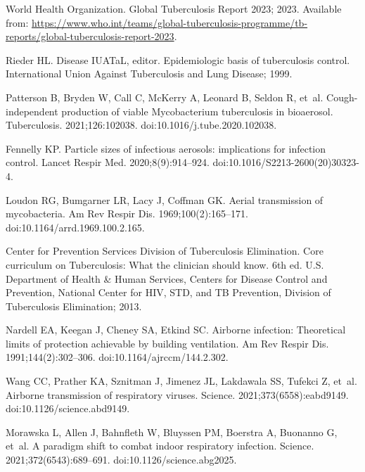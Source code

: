 \documentclass[fleqn,11pt]{wlscirep}
\begin{document}
\begin{thebibliography}{10}

{World Health Organization}.
\newblock Global {Tuberculosis} {Report} 2023; 2023.
\newblock Available from:
  \url{https://www.who.int/teams/global-tuberculosis-programme/tb-reports/global-tuberculosis-report-2023}.

Rieder HL. Disease IUATaL, editor. Epidemiologic basis of tuberculosis control.
\newblock International Union Against Tuberculosis and Lung Disease; 1999.

Patterson B, Bryden W, Call C, McKerry A, Leonard B, Seldon R, et~al.
\newblock Cough-independent production of viable {Mycobacterium} tuberculosis
  in bioaerosol.
\newblock Tuberculosis. 2021;126:102038.
\newblock doi:10.1016/j.tube.2020.102038.

Fennelly KP.
\newblock Particle sizes of infectious aerosols: implications for infection
  control.
\newblock Lancet Respir Med. 2020;8(9):914--924.
\newblock doi:10.1016/S2213-2600(20)30323-4.

Loudon RG, Bumgarner LR, Lacy J, Coffman GK.
\newblock Aerial transmission of mycobacteria.
\newblock Am Rev Respir Dis. 1969;100(2):165--171.
\newblock doi:10.1164/arrd.1969.100.2.165.

{Center for Prevention Services  Division of Tuberculosis Elimination}.
\newblock Core {curriculum} on {Tuberculosis}: {What} the {clinician} {should}
  {know}.
\newblock 6th ed. U.S. Department of Health \& Human Services, Centers for
  Disease Control and Prevention, National Center for HIV, STD, and TB
  Prevention, Division of Tuberculosis Elimination; 2013.

Nardell EA, Keegan J, Cheney SA, Etkind SC.
\newblock Airborne infection: {Theoretical} limits of protection achievable by
  building ventilation.
\newblock Am Rev Respir Dis. 1991;144(2):302--306.
\newblock doi:10.1164/ajrccm/144.2.302.

Wang CC, Prather KA, Sznitman J, Jimenez JL, Lakdawala SS, Tufekci Z, et~al.
\newblock Airborne transmission of respiratory viruses.
\newblock Science. 2021;373(6558):eabd9149.
\newblock doi:10.1126/science.abd9149.

Morawska L, Allen J, Bahnfleth W, Bluyssen PM, Boerstra A, Buonanno G, et~al.
\newblock A paradigm shift to combat indoor respiratory infection.
\newblock Science. 2021;372(6543):689--691.
\newblock doi:10.1126/science.abg2025.


\end{thebibliography}
\end{document}
